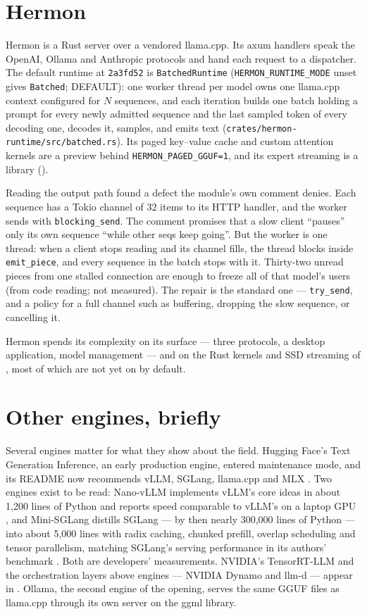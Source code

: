 \section{Hermon}

Hermon is a Rust server over a vendored llama.cpp. Its axum handlers speak the
OpenAI, Ollama and Anthropic protocols and hand each request to a dispatcher.
The default runtime at \texttt{2a3fd52} is \texttt{BatchedRuntime}
(\texttt{HERMON\_RUNTIME\_MODE} unset gives \texttt{Batched}; DEFAULT): one
worker thread per model owns one llama.cpp context configured for $N$ sequences,
and each iteration builds one batch holding a prompt for every newly admitted
sequence and the last sampled token of every decoding one, decodes it, samples,
and emits text (\texttt{crates/hermon-runtime/src/batched.rs}). Its paged
key--value cache and custom attention kernels are a preview behind
\texttt{HERMON\_PAGED\_GGUF=1}, and its expert streaming is a library
().

Reading the output path found a defect the module's own comment denies. Each
sequence has a Tokio channel of 32 items to its HTTP handler, and the worker
sends with \texttt{blocking\_send}. The comment promises that a slow client
``pauses'' only its own sequence ``while other seqs keep going''. But the
worker is one thread: when a client stops reading and its channel fills, the
thread blocks inside \texttt{emit\_piece}, and every sequence in the batch stops
with it. Thirty-two unread pieces from one stalled connection are enough to
freeze all of that model's users (from code reading; not measured). The repair is
the standard one --- \texttt{try\_send}, and a policy for a full channel such as
buffering, dropping the slow sequence, or cancelling it.

Hermon spends its complexity on its surface --- three protocols, a desktop
application, model management --- and on the Rust kernels and SSD streaming of
, most of which are not yet on by default.

\section{Other engines, briefly}

Several engines matter for what they show about the field. Hugging Face's Text
Generation Inference, an early production engine, entered maintenance mode, and
its README now recommends vLLM, SGLang, llama.cpp and MLX
\cite{huggingface2026tgi}. Two engines exist to be read: Nano-vLLM implements
vLLM's core ideas in about 1,200 lines of Python and reports speed comparable to
vLLM's on a laptop GPU \cite{nanovllm2025}, and Mini-SGLang distills SGLang ---
by then nearly 300,000 lines of Python --- into about 5,000 lines with radix
caching, chunked prefill, overlap scheduling and tensor parallelism, matching
SGLang's serving performance in its authors' benchmark \cite{lmsys2025minisgl}.
Both are developers' measurements. NVIDIA's TensorRT-LLM and the orchestration
layers above engines --- NVIDIA Dynamo and llm-d --- appear in
. Ollama, the second engine of the opening, serves the same
GGUF files as llama.cpp through its own server on the ggml library.

